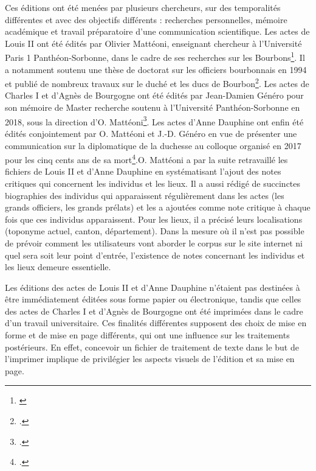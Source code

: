 \par Ces éditions ont été menées par plusieurs chercheurs, sur des temporalités différentes et avec des objectifs différents : recherches personnelles, mémoire académique et travail préparatoire d'une communication scientifique. Les actes de Louis II ont été édités par Olivier Mattéoni, enseignant chercheur à l'Université Paris 1 Panthéon-Sorbonne, dans le cadre de ses recherches sur les Bourbons\footnote{\cite{matteoniEcriturePouvoirPrincier2011}}. Il a notamment soutenu une thèse de doctorat sur les officiers bourbonnais en 1994 et publié de nombreux travaux sur le duché et les ducs de Bourbon\footnote{\cite{matteoniServirPrinceOfficiers1994}.}. Les actes de Charles I et d'Agnès de Bourgogne ont été édités par Jean-Damien Généro pour son mémoire de Master recherche soutenu à l'Université Panthéon-Sorbonne en 2018, sous la direction d'O. Mattéoni\footnote{\cite{generoChancellerieCharlesIer2018}.}. Les actes d'Anne Dauphine ont enfin été édités conjointement par O. Mattéoni et J.-D. Généro en vue de présenter une communication sur la diplomatique de la duchesse au colloque organisé en 2017 pour les cinq cents ans de sa mort\footnote{\cite{matteoniActesAnneDauphine2019}.}.O. Mattéoni a par la suite retravaillé les fichiers de Louis II et d'Anne Dauphine en systématisant l'ajout des notes critiques qui concernent les individus et les lieux. Il a aussi rédigé de succinctes biographies des individus qui apparaissent régulièrement dans les actes (les grands officiers, les grands prélats) et les a ajoutées comme note critique à chaque fois que ces individus apparaissent. Pour les lieux, il a précisé leurs localisations (toponyme actuel, canton, département). Dans la mesure où il n'est pas possible de prévoir comment les utilisateurs vont aborder le corpus sur le site internet ni quel sera soit leur point d'entrée, l'existence de notes concernant les individus et les lieux demeure essentielle. 

\par Les éditions des actes de Louis II et d'Anne Dauphine n'étaient pas destinées à être immédiatement éditées sous forme papier ou électronique, tandis que celles des actes de Charles I et d'Agnès de Bourgogne ont été imprimées dans le cadre d'un travail universitaire. Ces finalités différentes supposent des choix de mise en forme et de mise en page différents, qui ont une influence sur les traitements postérieurs. En effet, concevoir un fichier de traitement de texte dans le but de l'imprimer implique de privilégier les aspects visuels de l’édition et sa mise en page.

